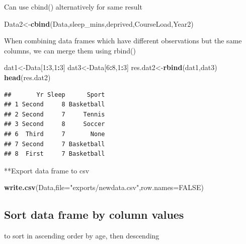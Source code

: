 \documentclass[
  openany]{book}
\newenvironment{Shaded}{\begin{snugshade}}{\end{snugshade}}
\newcommand{\AttributeTok}[1]{\textcolor[rgb]{0.13,0.29,0.53}{#1}}
\newcommand{\ConstantTok}[1]{\textcolor[rgb]{0.56,0.35,0.01}{#1}}
\newcommand{\DecValTok}[1]{\textcolor[rgb]{0.00,0.00,0.81}{#1}}
\newcommand{\FunctionTok}[1]{\textcolor[rgb]{0.13,0.29,0.53}{\textbf{#1}}}
\newcommand{\NormalTok}[1]{#1}
\newcommand{\OtherTok}[1]{\textcolor[rgb]{0.56,0.35,0.01}{#1}}
\newcommand{\SpecialCharTok}[1]{\textcolor[rgb]{0.81,0.36,0.00}{\textbf{#1}}}
\newcommand{\StringTok}[1]{\textcolor[rgb]{0.31,0.60,0.02}{#1}}
\begin{document}
Can use cbind() alternatively for same result

\begin{Shaded}
\begin{Highlighting}[]
\NormalTok{Data2}\OtherTok{\textless{}{-}}\FunctionTok{cbind}\NormalTok{(Data,sleep\_mins,deprived,CourseLoad,Year2)}
\end{Highlighting}
\end{Shaded}

When combining data frames which have different observations but the same columns, we can merge them using rbind()

\begin{Shaded}
\begin{Highlighting}[]
\NormalTok{dat1}\OtherTok{\textless{}{-}}\NormalTok{Data[}\DecValTok{1}\SpecialCharTok{:}\DecValTok{3}\NormalTok{,}\DecValTok{1}\SpecialCharTok{:}\DecValTok{3}\NormalTok{]}
\NormalTok{dat3}\OtherTok{\textless{}{-}}\NormalTok{Data[}\DecValTok{6}\SpecialCharTok{:}\DecValTok{8}\NormalTok{,}\DecValTok{1}\SpecialCharTok{:}\DecValTok{3}\NormalTok{]}
\NormalTok{res.dat2}\OtherTok{\textless{}{-}}\FunctionTok{rbind}\NormalTok{(dat1,dat3)}
\FunctionTok{head}\NormalTok{(res.dat2)}
\end{Highlighting}
\end{Shaded}

\begin{verbatim}
##       Yr Sleep      Sport
## 1 Second     8 Basketball
## 2 Second     7     Tennis
## 3 Second     8     Soccer
## 6  Third     7       None
## 7 Second     7 Basketball
## 8  First     7 Basketball
\end{verbatim}

**Export data frame to csv

\begin{Shaded}
\begin{Highlighting}[]
\FunctionTok{write.csv}\NormalTok{(Data,}\AttributeTok{file=}\StringTok{"exports/newdata.csv"}\NormalTok{,}\AttributeTok{row.names=}\ConstantTok{FALSE}\NormalTok{)}
\end{Highlighting}
\end{Shaded}

\subsection{\texorpdfstring{\textbf{Sort data frame by column values}}{Sort data frame by column values}}\label{sort-data-frame-by-column-values}

to sort in ascending order by age, then descending
\end{document}
